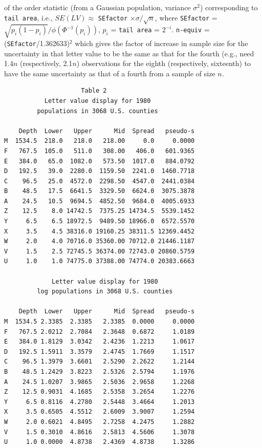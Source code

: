 \documentclass[oneside]{article}
\begin{document}
\begin{table}
{{of the order statistic (from a Gaussian population, variance $\sigma^2$) 
corresponding to \texttt{tail area}, i.e., 
  $SE(LV) \approx$ \texttt{SEfactor} $\times \sigma / \sqrt{n}$,
where \texttt{SEfactor} = $\sqrt{p_i (1-p_i)} / \phi(\Phi^{-1}(p_i))$,
$p_i$ = \texttt{tail area} = $2^{-i}$.
\texttt{n-equiv} = (\texttt{SEfactor}/1.362633)$^2$ which gives
the factor of increase in sample size for the uncertainty in
that letter value to be the same as that for the fourth
(e.g., need 1.4$n$ (respectively, 2.1$n$) observations for the 
eighth (respectively, sixteenth) to have 
the same uncertainty as that of a fourth from a sample of size $n$.
}}
\label{tbl:letter-values}
\end{table}




\begin{verbatim}
                     Table 2
           Letter value display for 1980
         populations in 3068 U.S. counties

    Depth  Lower   Upper      Mid  Spread   pseudo-s
M  1534.5  218.0   218.0   218.00     0.0     0.0000
F   767.5  105.0   511.0   308.00   406.0   601.9365
E   384.0   65.0  1082.0   573.50  1017.0   884.0792
D   192.5   39.0  2280.0  1159.50  2241.0  1460.7718
C    96.5   25.0  4572.0  2298.50  4547.0  2441.0384
B    48.5   17.5  6641.5  3329.50  6624.0  3075.3878
A    24.5   10.5  9694.5  4852.50  9684.0  4005.6933
Z    12.5    8.0 14742.5  7375.25 14734.5  5539.1452
Y     6.5    6.5 18972.5  9489.50 18966.0  6572.5570
X     3.5    4.5 38316.0 19160.25 38311.5 12369.4452
W     2.0    4.0 70716.0 35360.00 70712.0 21446.1187
V     1.5    2.5 72745.5 36374.00 72743.0 20860.5759
U     1.0    1.0 74775.0 37388.00 74774.0 20383.6663

             Letter value display for 1980
         log populations in 3068 U.S. counties

    Depth  Lower   Upper      Mid  Spread   pseudo-s
M  1534.5 2.3385  2.3385   2.3385  0.0000     0.0000
F   767.5 2.0212  2.7084   2.3648  0.6872     1.0189
E   384.0 1.8129  3.0342   2.4236  1.2213     1.0617
D   192.5 1.5911  3.3579   2.4745  1.7669     1.1517
C    96.5 1.3979  3.6601   2.5290  2.2622     1.2144
B    48.5 1.2429  3.8223   2.5326  2.5794     1.1976
A    24.5 1.0207  3.9865   2.5036  2.9658     1.2268
Z    12.5 0.9031  4.1685   2.5358  3.2654     1.2276
Y     6.5 0.8116  4.2780   2.5448  3.4664     1.2013
X     3.5 0.6505  4.5512   2.6009  3.9007     1.2594
W     2.0 0.6021  4.8495   2.7258  4.2475     1.2882
V     1.5 0.3010  4.8616   2.5813  4.5606     1.3078
U     1.0 0.0000  4.8738   2.4369  4.8738     1.3286
\end{verbatim}
\end{document}

